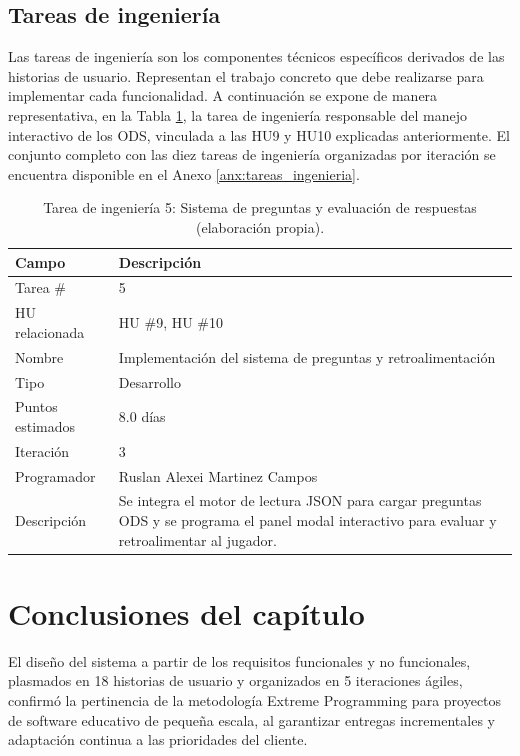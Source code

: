 \subsection{Tareas de ingeniería}
\label{subsec:tareas_ingenieria}

Las tareas de ingeniería son los componentes técnicos específicos derivados de las historias de usuario. Representan el trabajo concreto que debe realizarse para implementar cada funcionalidad. A continuación se expone de manera representativa, en la Tabla \ref{tab:ti5}, la tarea de ingeniería responsable del manejo interactivo de los ODS, vinculada a las HU9 y HU10 explicadas anteriormente. El conjunto completo con las diez tareas de ingeniería organizadas por iteración se encuentra disponible en el Anexo \ref{anx:tareas_ingenieria}.

\begin{table}[H]
\centering
\caption{Tarea de ingeniería 5: Sistema de preguntas y evaluación de respuestas (elaboración propia).\label{tab:ti5}}
\begin{tabular}{|p{}|p{}|}
\hline
\textbf{Campo} & \textbf{Descripción} \\
\hline
Tarea \# & 5 \\
\hline
HU relacionada & HU \#9, HU \#10 \\
\hline
Nombre & Implementación del sistema de preguntas y retroalimentación \\
\hline
Tipo & Desarrollo \\
\hline
Puntos estimados & 8.0 días \\
\hline
Iteración & 3 \\
\hline
Programador & Ruslan Alexei Martinez Campos \\
\hline
Descripción & Se integra el motor de lectura JSON para cargar preguntas ODS y se programa el panel modal interactivo para evaluar y retroalimentar al jugador. \\
\hline
\end{tabular}
\end{table}



\section*{Conclusiones del capítulo}

El diseño del sistema a partir de los requisitos funcionales y no funcionales, plasmados en 18 historias de usuario y organizados en 5 iteraciones ágiles, confirmó la pertinencia de la metodología Extreme Programming para proyectos de software educativo de pequeña escala, al garantizar entregas incrementales y adaptación continua a las prioridades del cliente.

